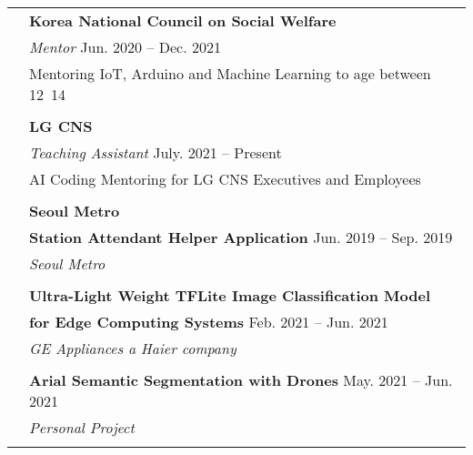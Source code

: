 \documentclass[letterpaper, 11pt]{article}
\begin{document}
\begin{longtable}{p{1.3in}p{4.8in}}
{\color{Violet}{Teaching experience}} 
& \textbf{Korea National Council on Social Welfare} \\ 
& {\it Mentor} \hfill  Jun. 2020 -- Dec. 2021 \\
& Mentoring IoT, Arduino and Machine Learning to age between 12~14 \\
& \\
& \textbf{LG CNS} \\ 
& {\it Teaching Assistant} \hfill  July. 2021 -- Present \\
& AI Coding Mentoring for LG CNS Executives and Employees\\
& \\



{\color{Violet}{Project experience}} 
& {\textbf{Seoul Metro}} \\
& {\textbf{Station Attendant Helper Application}} \hfill Jun. 2019 -- Sep. 2019 \\
& {\it Seoul Metro}  \\
& \\

& {\textbf{Ultra-Light Weight TFLite Image Classification Model}} \\
& {\textbf{for Edge Computing Systems}} \hfill Feb. 2021 -- Jun. 2021 \\
& {\it GE Appliances a Haier company}  \\
& \\

& {\textbf{Arial Semantic Segmentation with Drones}} \hfill May. 2021 -- Jun. 2021 \\
& {\it Personal Project} \\
& \\



\end{longtable}
\end{document}
